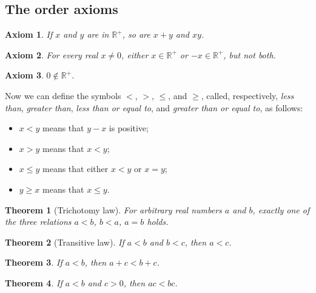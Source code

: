 \documentclass{article}
\newtheorem{axiom}{Axiom}[section]
\newtheorem{theorem}{Theorem}[section]
\begin{document}
\subsection{The order axioms}

\begin{axiom}
If \(x\) and \(y\) are in \(\mathbb{R}^{+}\), so are \(x + y\) and \(xy\). 
\end{axiom}

\begin{axiom}
For every real \(x \neq0\), either \(x \in \mathbb{R}^{+}\) or \(-x \in \mathbb{R}^{+}\), but not both.
\end{axiom}

\begin{axiom}
\(0 \notin \mathbb{R}^{+}\).
\end{axiom}

Now we can define the symbols $<$, $>$, $\leq$, and $\geq$, called, respectively, \emph{less than}, \emph{greater than}, \emph{less than or equal to}, and \emph{greater than or equal to}, as follows:


\begin{itemize}
\item \(x < y\) means that \(y - x\) is positive;

\item \(x > y\) means that \(x < y\);

\item \(x \leq y\) means that either \(x < y\) or \(x = y\);

\item \(y \geq x\) means that \(x \leq y\).
\end{itemize}

\begin{theorem}[Trichotomy law]
For arbitrary real numbers \(a\) and \(b\), exactly one of the three relations \(a < b\), \(b < a\), \(a = b\) holds.
\end{theorem}

\begin{theorem}[Transitive law]
If \(a < b\) and \(b < c\), then \(a < c\).
\end{theorem}

\begin{theorem}
If \(a < b\), then \(a + c < b + c\).
\end{theorem}

\begin{theorem}
If \(a < b\) and \(c > 0\), then \(ac < bc\).
\end{theorem}
\end{document}
